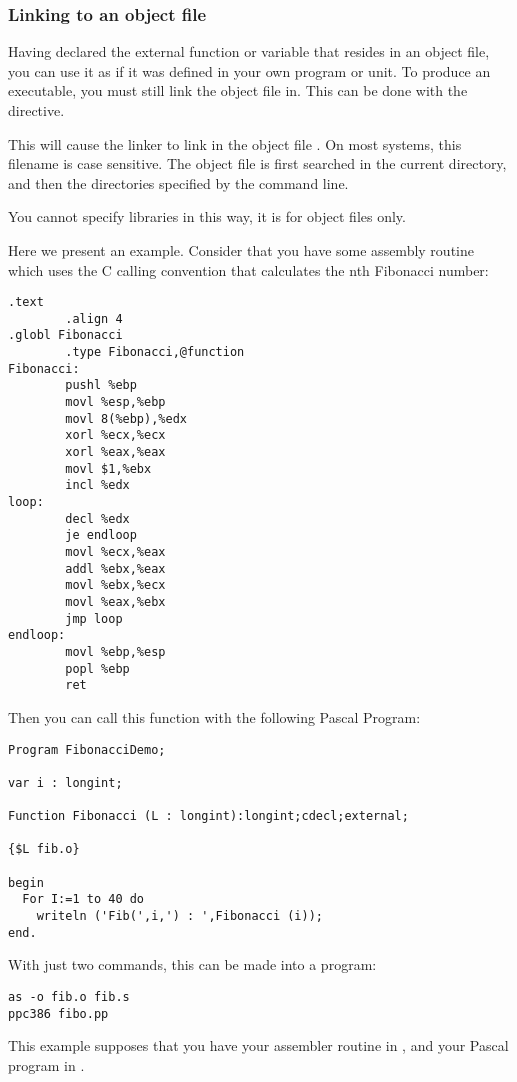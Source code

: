 \subsubsection{Linking to an object file}
\label{se:LinkIn}

Having declared the external function or variable that resides in an object file,
you can use it as if it was defined in your own program or unit.
To produce an executable, you must still link the object file in.
This can be done with the  directive.

This will cause the linker to link in the object file . On
most systems, this filename is case sensitive. The object file is
first searched in the current directory, and then the directories specified
by the  command line.

You cannot specify libraries in this way, it is for object files only.

Here we present an example. Consider that you have some assembly routine which uses
the C calling convention that calculates the nth Fibonacci number:
\begin{verbatim}
.text
        .align 4
.globl Fibonacci
        .type Fibonacci,@function
Fibonacci:
        pushl %ebp
        movl %esp,%ebp
        movl 8(%ebp),%edx
        xorl %ecx,%ecx
        xorl %eax,%eax
        movl $1,%ebx
        incl %edx
loop:
        decl %edx
        je endloop
        movl %ecx,%eax
        addl %ebx,%eax
        movl %ebx,%ecx
        movl %eax,%ebx
        jmp loop
endloop:
        movl %ebp,%esp
        popl %ebp
        ret
\end{verbatim}
Then you can call this function with the following Pascal Program:
\begin{verbatim}
Program FibonacciDemo;

var i : longint;

Function Fibonacci (L : longint):longint;cdecl;external;

{$L fib.o}

begin
  For I:=1 to 40 do
    writeln ('Fib(',i,') : ',Fibonacci (i));
end.
\end{verbatim}
With just two commands, this can be made into a program:
\begin{verbatim}
as -o fib.o fib.s
ppc386 fibo.pp
\end{verbatim}
This example supposes that you have your assembler routine in ,
and your Pascal program in .

